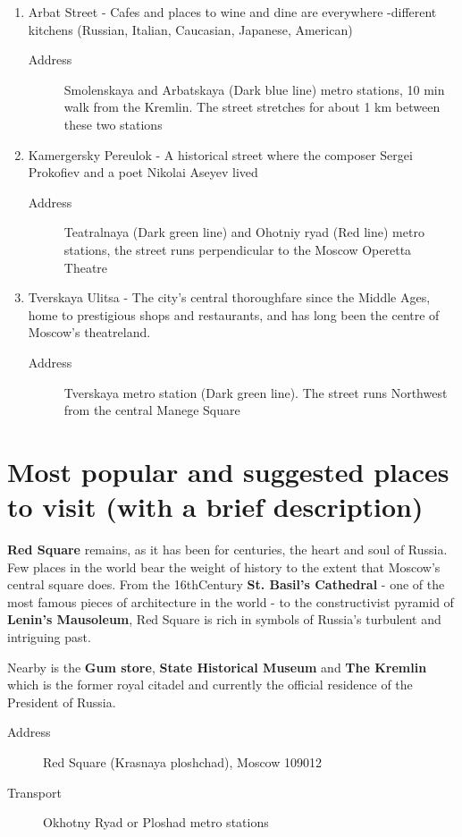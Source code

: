 \documentclass[10pt,fleqn,openany]{book} %
\begin{document}
\begin{enumerate}
	
	\item Arbat Street - Cafes and places to wine and dine are everywhere -different kitchens (Russian, Italian, Caucasian, Japanese, American)
		\begin{description}
			\item[Address] Smolenskaya and Arbatskaya (Dark blue line) metro stations, 10 min walk from the Kremlin. The street stretches for about 1 km between these two stations
		\end{description}
	\item Kamergersky Pereulok - A historical street where the composer Sergei Prokofiev and a poet Nikolai Aseyev lived
		\begin{description}
			\item[Address] Teatralnaya (Dark green line) and Ohotniy ryad (Red line) metro stations, the street runs perpendicular to the Moscow Operetta Theatre
		\end{description}
	\item Tverskaya Ulitsa - The city's central thoroughfare since the Middle Ages, home to prestigious shops and restaurants, and has long been the centre of Moscow's theatreland. 
		\begin{description}
			\item[Address] Tverskaya metro station (Dark green line). The street runs Northwest from the central Manege Square
		\end{description}
		
\end{enumerate}
\newpage
\section{Most popular and suggested places to visit (with a brief description)}
	
	\textbf{Red Square} remains, as it has been for centuries, the heart and soul of Russia. Few places in the world bear the weight of history to the extent that Moscow's central square does. From the 16thCentury \textbf{St. Basil's Cathedral} - one of the most famous pieces of architecture in the world - to the constructivist pyramid of\textbf{ Lenin's Mausoleum}, Red Square is rich in symbols of Russia's turbulent and intriguing past.
	
	
	Nearby is the \textbf{Gum store}, \textbf{State Historical Museum} and \textbf{The Kremlin} which is the former royal citadel and currently the official residence of the President of Russia.
		\begin{description}
			\item[Address] Red Square (Krasnaya ploshchad), Moscow 109012
			\item[Transport] Okhotny Ryad or Ploshad  metro stations
		\end{description}
		
\end{document}
